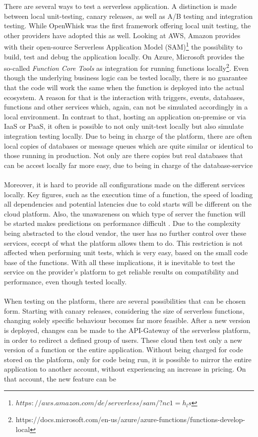 \documentclass[11pt]{article}
\begin{document}
There are several ways to test a serverless application. A distinction is made between local unit-testing, canary releases, as well as A/B testing and integration testing. While OpenWhisk was the first framework offering local unit testing, the other providers have adopted this as well. Looking at AWS, Amazon provides with their open-source Serverless Application Model (SAM)\footnote{$https://aws.amazon.com/de/serverless/sam/?nc1=h_ls$} the possibility to build, test and debug the application locally. On Azure, Microsoft provides the so-called \textit{Function Core Tools} as integration for running functions locally\footnote{https://docs.microsoft.com/en-us/azure/azure-functions/functions-develop-local}. Even though the underlying business logic can be tested locally, there is no guarantee that the code will work the same when the function is deployed into the actual ecosystem. A reason for that is the interaction with triggers, events, databases, functions and other services which, again, can not be simulated accordingly in a local environment. In contrast to that, hosting an application on-premise or via IaaS or PaaS, it often is possible to not only unit-test locally but also simulate integration testing locally. Due to being in charge of the platform, there are often local copies of databases or message queues which are quite similar or identical to those running in production. Not only are there copies but real databases that can be accest locally far more easy, due to being in charge of the \glqq database-service\grqq{}\\\\ Moreover, it is hard to provide all configurations made on the different services locally. Key figures, such as the execution time of a function, the speed of loading all dependencies and potential latencies due to cold starts will be different on the cloud platform. Also, the unawareness on which type of server the function will be started makes predictions on performance difficult \cite{racicot2019quality}. Due to the complexity being abstracted to the cloud vendor, the user has no further control over these services, ececpt of what the platform allows them to do. This restriction is not affected when performing unit tests, which is very easy, based on the small code base of the functions. With all these implications, it is inevitable to test the service on the provider's platform to get reliable results on compatibility and performance, even though tested locally.\\\\ When testing on the platform, there are several possibilities that can be chosen form. Starting with canary releases, considering the size of serverless functions, changing solely specific behaviour becomes far more feasible. After a new version is deployed, changes can be made to the API-Gateway of the serverless platform, in order to redirect a defined group of users. These cloud then test only a new version of a function or the entire application. Without being charged for code stored on the platform, only for code being run, it is possible to mirror the entire application to another account, without experiencing an increase in pricing. On that account, the new feature can be 
\end{document}
